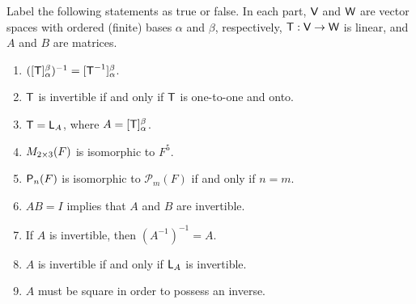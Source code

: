 \exercisesection

\begin{exercise} \label{exercise 2.4.1}
Label the following statements as true or false.
In each part, \(\textsf{V}\) and \(\textsf{W}\) are vector spaces with ordered (finite) bases \(\alpha\) and \(\beta\), respectively, \(\textsf{T}: \textsf{V} \to \textsf{W}\) is linear, and \(A\) and \(B\) are matrices.
\begin{enumerate}
\item \(([\textsf{T}]_{\alpha}^{\beta})^{-1} = [\textsf{T}^{-1}]_{\alpha}^{\beta}\).
\item \(\textsf{T}\) is invertible if and only if \(\textsf{T}\) is one-to-one and onto.
\item \(\textsf{T} = \textsf{L}_A\), where \(A = [\textsf{T}]_{\alpha}^{\beta}\).
\item \(M_{2 \times 3}(F)\) is isomorphic to \(F^5\).
\item \(\textsf{P}_n(F)\) is isomorphic to \(\mathcal{P}_m(F)\) if and only if \(n = m\).
\item \(AB = I\) implies that \(A\) and \(B\) are invertible.
\item If \(A\) is invertible, then \((A^{-1})^{-1} = A\).
\item \(A\) is invertible if and only if \(\textsf{L}_A\) is invertible.
\item \(A\) must be square in order to possess an inverse.
\end{enumerate}
\end{exercise}

